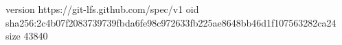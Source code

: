 version https://git-lfs.github.com/spec/v1
oid sha256:2c4b07f2083739739fbda6fe98c972633fb225ae8648bb46d1f107563282ca24
size 43840
